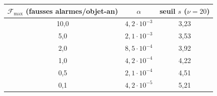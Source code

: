 \begin{tabular}{ccc}
\toprule
$\mathcal{F}_{\mathrm{max}}$ (fausses alarmes/objet-an) & $\alpha$ & seuil $s$ ($\nu = 20$) \\
\midrule
10,0 & $4,2 \cdot 10^{-3}$ & 3,23 \\
5,0 & $2,1 \cdot 10^{-3}$ & 3,53 \\
2,0 & $8,5 \cdot 10^{-4}$ & 3,92 \\
1,0 & $4,2 \cdot 10^{-4}$ & 4,22 \\
0,5 & $2,1 \cdot 10^{-4}$ & 4,51 \\
0,1 & $4,2 \cdot 10^{-5}$ & 5,21 \\
\bottomrule
\end{tabular}
